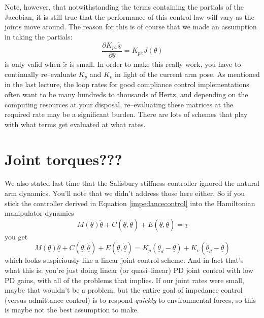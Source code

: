\documentclass[]{article}
\begin{document}
Note, however, that notwithstanding the terms containing the partials of the Jacobian, it is still true that the performance of this control law will vary as the joints move around. The reason for this is of course that we made an assumption in taking the partials:
\begin{displaymath}
    \frac{\partial K_{px}\tilde{\underline{x}}}{\partial \underline{\theta}} = K_{px}J(\underline{\theta})
\end{displaymath}
is only valid when $\tilde{\underline{x}}$ is small. In order to make this really work, you have to continually re--evaluate $K_{p}$ and $K_{v}$ in light of the current arm pose. As mentioned in the last lecture, the loop rates for good compliance control implementations often want to be many hundreds to thousands of Hertz, and depending on the computing resources at your disposal, re--evaluating these matrices at the required rate may be a significant burden. There are lots of schemes that play with what terms get evaluated at what rates.

\section{Joint torques???}
We also stated last time that the Salisbury stiffness controller ignored the natural arm dynamics. You'll note that we didn't address those here either. So if you stick the controller derived in Equation \ref{impedancecontrol} into the Hamiltonian manipulator dynamics
\begin{displaymath}
 M(\underline{\theta})\ddot{\underline{\theta}} + C(\underline{\theta}, \dot{\underline{\theta}}) + E(\underline{\theta}, \dot{\underline{\theta}}) = \underline{\tau}
\end{displaymath}
you get
\begin{equation}
 M(\underline{\theta})\ddot{\underline{\theta}} + C(\underline{\theta}, \dot{\underline{\theta}}) + E(\underline{\theta}, \dot{\underline{\theta}}) = K_{p}(\underline{\theta}_{d} - \underline{\theta}) + K_{v}(\dot{\underline{\theta}}_{d} - \dot{\underline{\theta}})
\end{equation}
which looks suspiciously like a linear joint control scheme. And in fact that's what this is: you're just doing linear (or quasi--linear) PD joint control with low PD gains, with all of the problems that implies. If our joint rates were small, maybe that wouldn't be a problem, but the entire goal of impedance control (versus admittance control) is to respond \textit{quickly} to environmental forces, so this is maybe not the best assumption to make.
\end{document}
